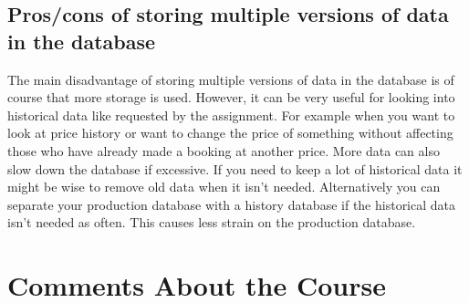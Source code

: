 \documentclass[a4paper]{scrartcl}
\begin{document}
\subsection{Pros/cons of storing multiple versions of data in the database}
The main disadvantage of storing multiple versions of data in the database is of course that more storage is used. However, it can be very useful for looking into historical data like requested by the assignment. For example when you want to look at price history or want to change the price of something without affecting those who have already made a booking at another price. More data can also slow down the database if excessive. If you need to keep a lot of historical data it might be wise to remove old data when it isn't needed. Alternatively you can separate your production database with a history database if the historical data isn't needed as often. This causes less strain on the production database.

\section{Comments About the Course}
\end{document}
